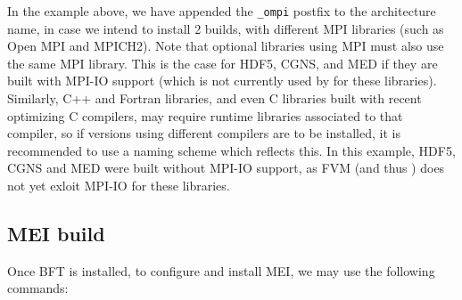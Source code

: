 \documentclass[a4paper,10pt,twoside]{article}
\begin{document}

In the example above, we have appended the \texttt{\_ompi} postfix
to the architecture name, in case we intend to install 2 builds,
with different MPI libraries (such as Open MPI and MPICH2).
Note that optional libraries using MPI must also use the same MPI
library. This is the case for HDF5, CGNS, and MED if they are built
with MPI-IO support (which is not currently used by \CS for these libraries).
Similarly, C++ and Fortran libraries, and even C libraries built with recent
optimizing C compilers, may require runtime libraries associated to that
compiler, so if versions using different compilers are to be installed, it is
recommended to use a naming scheme which reflects this.
In this example, HDF5, CGNS and MED were built without MPI-IO support,
as FVM (and thus \CS) does not yet exloit MPI-IO for these libraries.

\subsection{MEI build\label{sec:mei:config:examples}}

Once BFT is installed, to configure and install MEI, we may
use the following commands:
\end{document}
